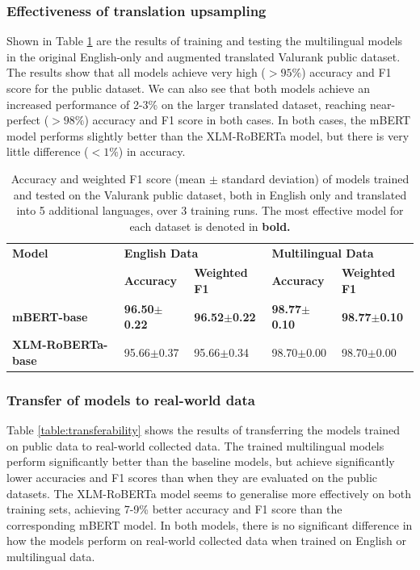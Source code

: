 \documentclass{l4proj}
\begin{document}
\subsubsection{Effectiveness of translation upsampling}  \hfill \par
Shown in Table \ref{table:backtranslation-effectiveness} are the results of training and testing the multilingual models in the original English-only and augmented translated Valurank public dataset. The results show that all models achieve very high ($>95\%$) accuracy and F1 score for the public dataset. We can also see that both models achieve an increased performance of 2-3\% on the larger translated dataset, reaching near-perfect ($>98\%$) accuracy and F1 score in both cases. In both cases, the mBERT model performs slightly better than the XLM-RoBERTa model, but there is very little difference ($<1\%$) in accuracy.

\begin{table}[]
\begin{tabular}{lllll}
\hline
\textbf{Model}   & \multicolumn{2}{l}{\textbf{English Data}} & \multicolumn{2}{l}{\textbf{Multilingual Data}} \\ \cline{2-5} 
                 & \textbf{Accuracy}    & \textbf{Weighted F1}   & \textbf{Accuracy}   & \textbf{Weighted F1}   \\ \hline 
\textbf{mBERT-base}       & \textbf{96.50$\pm$0.22}    & \textbf{96.52$\pm$0.22}          & \textbf{98.77$\pm$0.10}       & \textbf{98.77$\pm$0.10}          \\
\textbf{XLM-RoBERTa-base} & 95.66$\pm$0.37    & 95.66$\pm$0.34          & 98.70$\pm$0.00       & 98.70$\pm$0.00   
     \\ \hline
\end{tabular}
\caption{Accuracy and weighted F1 score (mean $\pm$ standard deviation) of models trained and tested on the Valurank public dataset, both in English only and translated into 5 additional languages, over 3 training runs. The most effective model for each dataset is denoted in \textbf{bold.}}
\label{table:backtranslation-effectiveness}
\end{table}

\subsubsection{Transfer of models to real-world data}  \hfill \par

Table \ref{table:transferability} shows the results of transferring the models trained on public data to real-world collected data. The trained multilingual models perform significantly better than the baseline models, but achieve significantly lower accuracies and F1 scores than when they are evaluated on the public datasets. The XLM-RoBERTa model seems to generalise more effectively on both training sets, achieving 7-9\% better accuracy and F1 score than the corresponding mBERT model. In both models, there is no significant difference in how the models perform on real-world collected data when trained on English or multilingual data.
\end{document}
